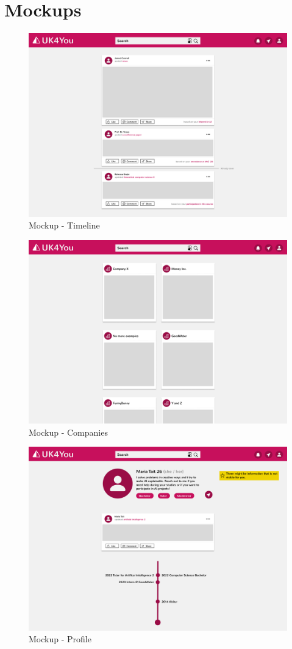 \section{Mockups}

\begin{figure}[ht]
    \centering
    \includegraphics[width=1\columnwidth]{figures/timeline.pdf}
    \caption{\label{fig:timeline} Mockup - Timeline}
\end{figure}

\begin{figure}[ht]
    \centering
    \includegraphics[width=1\columnwidth]{figures/company.pdf}
    \caption{\label{fig:company} Mockup - Companies}
\end{figure}

\begin{figure}[ht]
    \centering
    \includegraphics[width=1\columnwidth]{figures/profile.pdf}
    \caption{\label{fig:profile} Mockup - Profile}
\end{figure}
